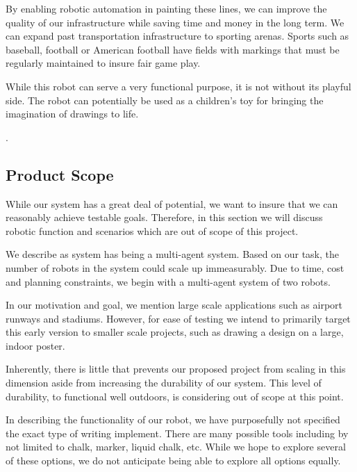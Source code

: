 By enabling robotic automation in painting these lines, we can improve the quality of our infrastructure while saving time and money in the long term. We can expand past transportation infrastructure to sporting arenas. Sports such as baseball, football or American football have fields with markings that must be regularly maintained to insure fair game play. 

While this robot can serve a very functional purpose, it is not without its playful side. The robot can potentially be used as a children's toy for bringing the imagination of drawings to life. 

.

\subsection{Product Scope}
\label{sec:project_scope}
While our  system has a great deal of potential, we want to insure that we can reasonably achieve testable goals. Therefore, in this section we will discuss robotic function and scenarios which are out of scope of this project. 

We describe as system has being a multi-agent system. Based on our task, the number of robots in the system could scale up immeasurably. Due to time, cost and planning constraints, we begin with a multi-agent system of two  robots. 

In our motivation and goal, we mention large scale applications such as airport runways and stadiums. However, for ease of testing we intend to primarily target this early version to smaller scale projects, such as drawing a design on a large, indoor poster. 

Inherently, there is little that prevents our proposed project from scaling in this dimension aside from increasing the durability of our system. This level of durability, to functional well outdoors, is considering out of scope at this point. 

In describing the functionality of our robot, we have purposefully not specified the exact type of writing implement. There are many possible tools including by not limited to chalk,  marker, liquid chalk, etc. While we hope to explore several of these options, we do not anticipate being able to explore all options equally. 

